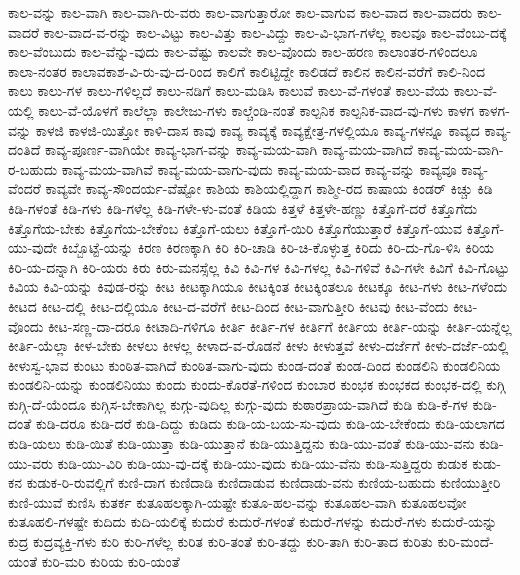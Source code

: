 {ಕಾಲ-ವನ್ನು
ಕಾಲ-ವಾಗಿ
ಕಾಲ-ವಾಗಿ-ರು-ವರು
ಕಾಲ-ವಾಗುತ್ತಾರೋ
ಕಾಲ-ವಾಗುವ
ಕಾಲ-ವಾದ
ಕಾಲ-ವಾದರು
ಕಾಲ-ವಾದರೆ
ಕಾಲ-ವಾದ-ವ-ರನ್ನು
ಕಾಲ-ವಿಟ್ಟು
ಕಾಲ-ವಿತ್ತು
ಕಾಲ-ವಿದ್ದು
ಕಾಲ-ವಿ-ಭಾಗ-ಗಳೆಲ್ಲ
ಕಾಲವೂ
ಕಾಲ-ವೆಂಬು-ದಕ್ಕೆ
ಕಾಲ-ವೆಂಬುದು
ಕಾಲ-ವೆನ್ನು-ವುದು
ಕಾಲ-ವೆಷ್ಟು
ಕಾಲವೇ
ಕಾಲ-ವೊಂದು
ಕಾಲ-ಹರಣ
ಕಾಲಾಂತರ-ಗಳಿಂದಲೂ
ಕಾಲಾ-ನಂತರ
ಕಾಲಾವಕಾಶ-ವಿ-ರು-ವು-ದ-ರಿಂದ
ಕಾಲಿಗೆ
ಕಾಲಿಟ್ಟಿದ್ದೇ
ಕಾಲಿಡದೆ
ಕಾಲಿನ
ಕಾಲಿನ-ವರೆಗೆ
ಕಾಲಿ-ನಿಂದ
ಕಾಲು
ಕಾಲು-ಗಳ
ಕಾಲು-ಗಳಿಲ್ಲದೆ
ಕಾಲು-ನಡಿಗೆ
ಕಾಲು-ಮಡಿಸಿ
ಕಾಲುವೆ
ಕಾಲು-ವೆ-ಗಳಂತೆ
ಕಾಲು-ವೆಯ
ಕಾಲು-ವೆ-ಯಲ್ಲಿ
ಕಾಲು-ವೆ-ಯೊಳಗೆ
ಕಾಲೆಲ್ಲಾ
ಕಾಲೇಜು-ಗಳು
ಕಾಲ್ಚೆಂಡಿ-ನಂತೆ
ಕಾಲ್ಪನಿಕ
ಕಾಲ್ಪನಿಕ-ವಾದ-ವು-ಗಳು
ಕಾಳಗ
ಕಾಳಗ-ವನ್ನು
ಕಾಳಜಿ
ಕಾಳಜಿ-ಯಿತ್ತೋ
ಕಾಳಿ-ದಾಸ
ಕಾವು
ಕಾವ್ಯ
ಕಾವ್ಯಕ್ಕೆ
ಕಾವ್ಯಕ್ಷೇತ್ರ-ಗಳಲ್ಲಿಯೂ
ಕಾವ್ಯ-ಗಳನ್ನೂ
ಕಾವ್ಯದ
ಕಾವ್ಯ-ದಂತಿದೆ
ಕಾವ್ಯ-ಪೂರ್ಣ-ವಾಗಿಯೇ
ಕಾವ್ಯ-ಭಾಗ-ವನ್ನು
ಕಾವ್ಯ-ಮಯ-ವಾಗಿ
ಕಾವ್ಯ-ಮಯ-ವಾಗಿದೆ
ಕಾವ್ಯ-ಮಯ-ವಾಗಿ-ರ-ಬಹುದು
ಕಾವ್ಯ-ಮಯ-ವಾಗಿವೆ
ಕಾವ್ಯ-ಮಯ-ವಾಗು-ವುದು
ಕಾವ್ಯ-ಮಯ-ವಾದ
ಕಾವ್ಯ-ವನ್ನು
ಕಾವ್ಯವೂ
ಕಾವ್ಯ-ವೆಂದರೆ
ಕಾವ್ಯವೇ
ಕಾವ್ಯ-ಸೌಂದರ್ಯ-ವೆಷ್ಟೋ
ಕಾಶಿಯ
ಕಾಶಿಯಲ್ಲಿದ್ದಾಗ
ಕಾಶ್ಮೀ-ರದ
ಕಾಷಾಯ
ಕಿಂಡರ್
ಕಿಚ್ಚು
ಕಿಡಿ
ಕಿಡಿ-ಗಳಂತೆ
ಕಿಡಿ-ಗಳು
ಕಿಡಿ-ಗಳೆಲ್ಲ
ಕಿಡಿ-ಗಳೇ-ಳು-ವಂತೆ
ಕಿಡಿಯ
ಕಿತ್ತಳೆ
ಕಿತ್ತಳೇ-ಹಣ್ಣು
ಕಿತ್ತೊಗೆ-ದರೆ
ಕಿತ್ತೊಗೆದು
ಕಿತ್ತೊಗೆಯ-ಬೇಕು
ಕಿತ್ತೊಗೆಯ-ಬೇಕೆಂಬ
ಕಿತ್ತೊಗೆ-ಯಲು
ಕಿತ್ತೊಗೆ-ಯಿರಿ
ಕಿತ್ತೊಗೆಯುತ್ತಾರೆ
ಕಿತ್ತೊಗೆ-ಯುವ
ಕಿತ್ತೊಗೆ-ಯು-ವುದೇ
ಕಿಬ್ಬೊಟ್ಟೆ-ಯನ್ನು
ಕಿರಣ
ಕಿರಣಕ್ಕಾಗಿ
ಕಿರಿ
ಕಿರಿ-ಚಾಡಿ
ಕಿರಿ-ಚಿ-ಕೊಳ್ಳುತ್ತ
ಕಿರಿದು
ಕಿರಿ-ದು-ಗೊ-ಳಿಸಿ
ಕಿರಿಯ
ಕಿರಿ-ಯ-ದನ್ನಾಗಿ
ಕಿರಿ-ಯರು
ಕಿರು
ಕಿರು-ಮನಸ್ಸೆಲ್ಲ
ಕಿವಿ
ಕಿವಿ-ಗಳ
ಕಿವಿ-ಗಳಲ್ಲ
ಕಿವಿ-ಗಳಿವೆ
ಕಿವಿ-ಗಳೇ
ಕಿವಿಗೆ
ಕಿವಿ-ಗೊಟ್ಟು
ಕಿವಿಯ
ಕಿವಿ-ಯನ್ನು
ಕಿವುಡ-ರನ್ನು
ಕೀಟ
ಕೀಟಕ್ಕಾಗಿಯೂ
ಕೀಟಕ್ಕಿಂತ
ಕೀಟಕ್ಕಿಂತಲೂ
ಕೀಟಕ್ಕೂ
ಕೀಟ-ಗಳು
ಕೀಟ-ಗಳೆಂದು
ಕೀಟದ
ಕೀಟ-ದಲ್ಲಿ
ಕೀಟ-ದಲ್ಲಿಯೂ
ಕೀಟ-ದ-ವರೆಗೆ
ಕೀಟ-ದಿಂದ
ಕೀಟ-ವಾಗುತ್ತೀರಿ
ಕೀಟವು
ಕೀಟ-ವೆಂದು
ಕೀಟ-ವೊಂದು
ಕೀಟ-ಸಣ್ಣ-ದಾ-ದರೂ
ಕೀಟಾದಿ-ಗಳಿಗೂ
ಕೀರ್ತಿ
ಕೀರ್ತಿ-ಗಳ
ಕೀರ್ತಿಗೆ
ಕೀರ್ತಿಯ
ಕೀರ್ತಿ-ಯನ್ನು
ಕೀರ್ತಿ-ಯನ್ನೆಲ್ಲ
ಕೀರ್ತಿ-ಯೆಲ್ಲಾ
ಕೀಳ-ಬೇಕು
ಕೀಳಲು
ಕೀಳಲ್ಲ
ಕೀಳಾದ-ವ-ರೊಡನೆ
ಕೀಳು
ಕೀಳುತ್ತವೆ
ಕೀಳು-ದರ್ಜೆಗೆ
ಕೀಳು-ದರ್ಜೆ-ಯಲ್ಲಿ
ಕೀಳುಸ್ವ-ಭಾವ
ಕುಂಟು
ಕುಂಠಿತ-ವಾಗಿದೆ
ಕುಂಠಿತ-ವಾಗು-ವುದು
ಕುಂಡ-ದಂತೆ
ಕುಂಡ-ದಿಂದ
ಕುಂಡಲಿನಿ
ಕುಂಡಲಿನಿಯ
ಕುಂಡಲಿನಿ-ಯನ್ನು
ಕುಂಡಲಿನಿಯು
ಕುಂದು
ಕುಂದು-ಕೊರತೆ-ಗಳಿಂದ
ಕುಂಬಾರ
ಕುಂಭಕ
ಕುಂಭಕದ
ಕುಂಭಕ-ದಲ್ಲಿ
ಕುಗ್ಗಿ
ಕುಗ್ಗಿ-ದೆ-ಯೆಂದೂ
ಕುಗ್ಗಿಸ-ಬೇಕಾಗಿಲ್ಲ
ಕುಗ್ಗು-ವುದಿಲ್ಲ
ಕುಗ್ಗು-ವುದು
ಕುಠಾರಪ್ರಾಯ-ವಾಗಿದೆ
ಕುಡಿ
ಕುಡಿ-ಕೆ-ಗಳ
ಕುಡಿ-ದಂತೆ
ಕುಡಿ-ದರೂ
ಕುಡಿ-ದರೆ
ಕುಡಿ-ದಿದ್ದು
ಕುಡಿದು
ಕುಡಿ-ಯ-ಬಯ-ಸು-ವುದು
ಕುಡಿ-ಯ-ಬೇಕೆಂದು
ಕುಡಿ-ಯಲಾಗದ
ಕುಡಿ-ಯಲು
ಕುಡಿ-ಯಿತೆ
ಕುಡಿ-ಯುತ್ತಾ
ಕುಡಿ-ಯುತ್ತಾನೆ
ಕುಡಿ-ಯುತ್ತಿದ್ದನು
ಕುಡಿ-ಯು-ವಂತೆ
ಕುಡಿ-ಯು-ವನು
ಕುಡಿ-ಯು-ವರು
ಕುಡಿ-ಯು-ವಿರಿ
ಕುಡಿ-ಯು-ವು-ದಕ್ಕೆ
ಕುಡಿ-ಯು-ವುದು
ಕುಡಿ-ಯು-ವೆನು
ಕುಡಿ-ಸುತ್ತಿದ್ದರು
ಕುಡುಕ
ಕುಡು-ಕನ
ಕುಡುಕ-ರಿ-ರುವಲ್ಲಿಗೆ
ಕುಣಿ-ದಾಗ
ಕುಣಿದಾಡಿ
ಕುಣಿದಾಡುವ
ಕುಣಿದಾಡು-ವನು
ಕುಣಿಯ-ಬಹುದು
ಕುಣಿಯುತ್ತೀರಿ
ಕುಣಿ-ಯುವೆ
ಕುಣಿಸಿ
ಕುತರ್ಕ
ಕುತೂಹಲಕ್ಕಾಗಿ-ಯಷ್ಟೇ
ಕುತೂ-ಹಲ-ವನ್ನು
ಕುತೂಹಲ-ವಾಗಿ
ಕುತೂಹಲವೋ
ಕುತೂಹಲಿ-ಗಳಷ್ಟೇ
ಕುದಿದು
ಕುದಿ-ಯಲಿಕ್ಕೆ
ಕುದುರೆ
ಕುದುರೆ-ಗಳಂತೆ
ಕುದುರೆ-ಗಳನ್ನು
ಕುದುರೆ-ಗಳು
ಕುದುರೆ-ಯನ್ನು
ಕುದ್ರ
ಕುದ್ರವ್ಯಕ್ತಿ-ಗಳು
ಕುರಿ
ಕುರಿ-ಗಳೆಲ್ಲ
ಕುರಿತ
ಕುರಿ-ತಂತೆ
ಕುರಿ-ತದ್ದು
ಕುರಿ-ತಾಗಿ
ಕುರಿ-ತಾದ
ಕುರಿತು
ಕುರಿ-ಮಂದೆ-ಯಂತೆ
ಕುರಿ-ಮರಿ
ಕುರಿಯ
ಕುರಿ-ಯಂತೆ
}
